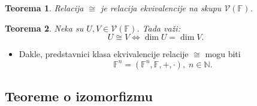 \documentclass[a4paper,12pt,twoside]{report}
\newtheorem{theorem}{Teorema}[section]
\numberwithin{algorithm}{section}
\begin{document}
\begin{theorem}
    Relacija $\cong$ je relacija ekvivalencije na skupu $\mathcal{V}(\mathbb{F})$.
\end{theorem}

\begin{theorem} \label{IzomorfizmiTeorema2}
    Neka su $U, V \in \mathcal{V}(\mathbb{F})$. Tada važi:
    \[ U \cong V \iff \dim U = \dim V. \]
\end{theorem}

\begin{itemize}
    \item Dakle, predstavnici klasa ekvivalencije relacije $\cong$ mogu biti \[\mathbb{F}^n = (\mathbb{F}^n, \mathbb{F}, +, \cdot),\; n \in \mathbb{N}.\]
\end{itemize}
\newpage
\subsection{Teoreme o izomorfizmu}
\end{document}
